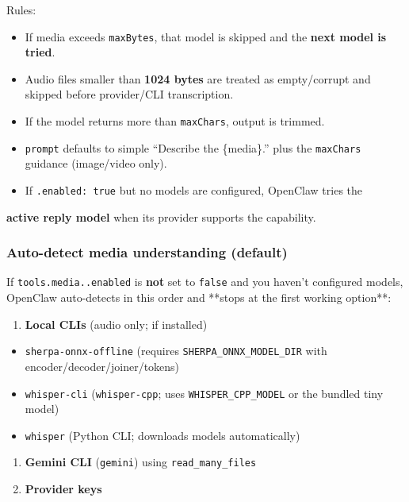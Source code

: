 Rules:

\begin{itemize}
  \item If media exceeds \texttt{maxBytes}, that model is skipped and the \textbf{next model is tried}.
  \item Audio files smaller than \textbf{1024 bytes} are treated as empty/corrupt and skipped before provider/CLI transcription.
  \item If the model returns more than \texttt{maxChars}, output is trimmed.
  \item \texttt{prompt} defaults to simple “Describe the \{media\}.” plus the \texttt{maxChars} guidance (image/video only).
  \item If \texttt{.enabled: true} but no models are configured, OpenClaw tries the
\end{itemize}

\textbf{active reply model} when its provider supports the capability.

\subsubsection{Auto-detect media understanding (default)}


If \texttt{tools.media..enabled} is \textbf{not} set to \texttt{false} and you haven’t
configured models, OpenClaw auto-detects in this order and **stops at the first
working option**:

\begin{enumerate}
  \item \textbf{Local CLIs} (audio only; if installed)
\end{enumerate}

\begin{itemize}
  \item \texttt{sherpa-onnx-offline} (requires \texttt{SHERPA\_ONNX\_MODEL\_DIR} with encoder/decoder/joiner/tokens)
  \item \texttt{whisper-cli} (\texttt{whisper-cpp}; uses \texttt{WHISPER\_CPP\_MODEL} or the bundled tiny model)
  \item \texttt{whisper} (Python CLI; downloads models automatically)
\end{itemize}

\begin{enumerate}
  \item \textbf{Gemini CLI} (\texttt{gemini}) using \texttt{read\_many\_files}
  \item \textbf{Provider keys}
\end{enumerate}

